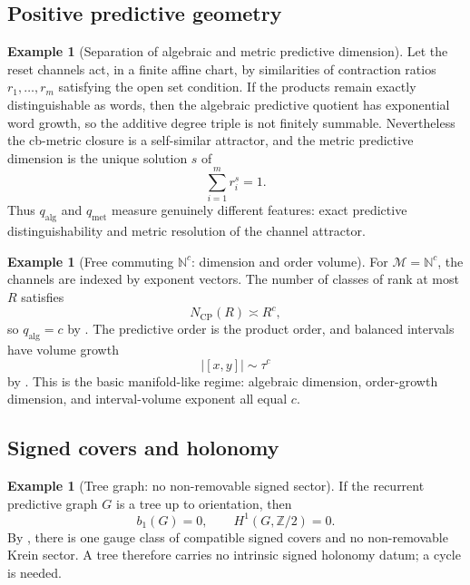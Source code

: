 \documentclass[11pt]{article}
\theoremstyle{definition}
\newtheorem{example}[theorem]{Example}
\theoremstyle{remark}
\newcommand{\N}{\mathbb{N}}
\newcommand{\Z}{\mathbb{Z}}
\newcommand{\M}{\mathcal{M}}
\newcommand{\CP}{\mathrm{CP}}
\newcommand{\qalg}{q_{\mathrm{alg}}}
\begin{document}
\subsection{Positive predictive geometry}
\label{subsec:examples-positive}

\begin{example}[Separation of algebraic and metric predictive dimension]
\label{ex:alg-metric-separation}
Let the reset channels act, in a finite affine chart, by similarities of
contraction ratios \(r_1,\ldots,r_m\) satisfying the open set condition.  If the
products remain exactly distinguishable as words, then the algebraic predictive
quotient has exponential word growth, so the additive degree triple is not
finitely summable.  Nevertheless the cb-metric closure is a self-similar
attractor, and the metric predictive dimension is the unique solution \(s\) of
\[
  \sum_{i=1}^{m} r_i^s=1.
\]
Thus \(q_{\mathrm{alg}}\) and \(q_{\mathrm{met}}\) measure genuinely different
features: exact predictive distinguishability and metric resolution of the
channel attractor.
\end{example}

\begin{example}[Free commuting \(\N^{c}\): dimension and order volume]
\label{ex:free-nc}
For \(\M=\N^{c}\), the channels are indexed by exponent vectors.  The number of
classes of rank at most \(R\) satisfies
\[
  N_{\CP}(R)\asymp R^{c},
\]
so \(\qalg=c\) by .  The predictive order is the product
order, and balanced intervals have volume growth
\[
  |[x,y]|\sim \tau^{c}
\]
by .  This is the basic manifold-like regime:
algebraic dimension, order-growth dimension, and interval-volume exponent all
equal \(c\).
\end{example}

\subsection{Signed covers and holonomy}
\label{subsec:examples-signed}

\begin{example}[Tree graph: no non-removable signed sector]
\label{ex:tree}
If the recurrent predictive graph \(G\) is a tree up to orientation, then
\[
  b_1(G)=0,\qquad H^1(G,\Z/2)=0 .
\]
By , there is one gauge class of
compatible signed covers and no non-removable Krein sector.  A tree therefore
carries no intrinsic signed holonomy datum; a cycle is needed.
\end{example}
\end{document}

